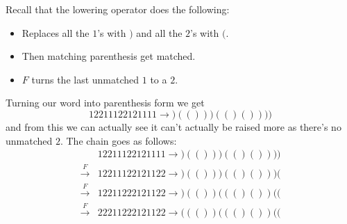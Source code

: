 \documentclass[12pt]{memoir}
\begin{document}
\begin{ptcbr}
    Recall that the lowering operator does the following:
    \begin{itemize}
        \item Replaces all the $1$'s with $)$ and all the $2$'s with $($.
        \item Then matching parenthesis get matched. 
        \item $F$ turns the last unmatched $1$ to a $2$.
    \end{itemize}
    Turning our word into parenthesis form we get
    $$12211122121111\to)(()))(()())))$$
    and from this we can actually see it can't actually be raised more as there's no unmatched $2$. The chain goes as follows:
    \begin{align*}
                       &12211122121111\to)(()))(()())))\\
        \xrightarrow{F}&12211122121122\to)(()))(()()))(\\
        \xrightarrow{F}&12211222121122\to)(())((()())((\\
        \xrightarrow{F}&22211222121122\to((())((()())((
    \end{align*}
\end{ptcbr}

\end{document}
